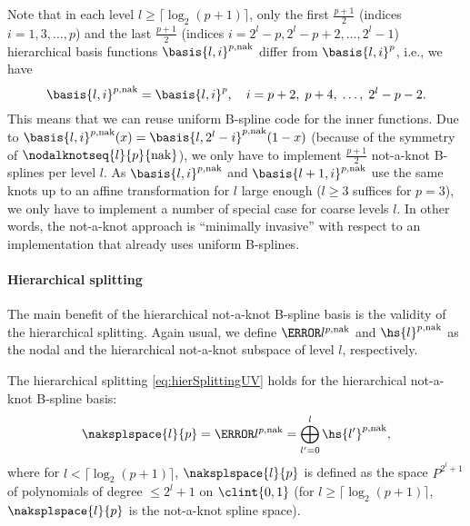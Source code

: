 Note that in each level $l \ge \lceil\log_2(p+1)\rceil$,
only the first $\tfrac{p+1}{2}$
(indices $i = 1, 3, \dotsc, p$)
and the last $\tfrac{p+1}{2}$
(indices $i = 2^l - p, 2^l - p + 2, \dotsc, 2^l - 1$)
hierarchical basis functions $\basis{l,i}^{p,\notaknot}$
differ from $\basis{l,i}^p$,
i.e., we have
\begin{equation}
  \basis{l,i}^{p,\notaknot} = \basis{l,i}^p,\quad
  i = p + 2,\; p + 4,\; \dotsc,\; 2^l - p - 2.
\end{equation}
This means that we can reuse uniform B-spline code
for the inner functions.
Due to $\basis{l,i}^{p,\notaknot}(x) = \basis{l,2^l-i}^{p,\notaknot}(1-x)$
(because of the symmetry of $\nodalknotseq{l}{p}{\notaknot}$),
we only have to implement $\tfrac{p+1}{2}$ not-a-knot B-splines per level $l$.
As $\basis{l,i}^{p,\notaknot}$ and $\basis{l+1,i}^{p,\notaknot}$
use the same knots up to an affine transformation for $l$ large enough
($l \ge 3$ suffices for $p = 3$),
we only have to implement a number of special case for coarse levels $l$.
In other words, the not-a-knot approach is ``minimally invasive''
with respect to an implementation that already uses uniform B-splines.

\paragraph{Hierarchical splitting}

The main benefit of the hierarchical not-a-knot B-spline basis
is the validity of the hierarchical splitting.
Again usual, we define $\ns{l}^{p,\notaknot}$ and $\hs{l}^{p,\notaknot}$
as the nodal and the hierarchical not-a-knot subspace of level $l$,
respectively.

\begin{proposition}
  \label{prop:hierSplittingNAKBSplineUV}
  The hierarchical splitting \eqref{eq:hierSplittingUV}
  holds for the hierarchical not-a-knot B-spline basis:
  \begin{equation}
    \naksplspace{l}{p}
    = \ns{l}^{p,\notaknot}
    = \bigoplus_{l'=0}^l \hs{l'}^{p,\notaknot},
  \end{equation}
  where for $l < \lceil\log_2(p+1)\rceil$, $\naksplspace{l}{p}$
  is defined as the space $P^{2^l + 1}$ of polynomials of degree
  $\le 2^l + 1$ on $\clint{0, 1}$
  (for $l \ge \lceil\log_2(p+1)\rceil$,
  $\naksplspace{l}{p}$ is the not-a-knot spline space).
\end{proposition}

